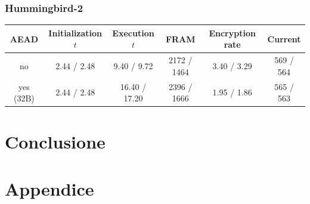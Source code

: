 \documentclass[target=bach,aauheader=,style=]{thud}
\begin{document}
		\subsection{Hummingbird-2}
		\begin{center}
			\begin{tabular}{|c| *{5}{c|}}
				\hline
				\textbf{AEAD} & \textbf{Initialization} $t$& \textbf{Execution} $t$ & \textbf{FRAM} & \textbf{Encryption rate} & \textbf{Current} \\
				\hline
				no & \textcolor{Mahogany}{2.44} / \textcolor{OliveGreen}{2.48} & \textcolor{Mahogany}{9.40} / \textcolor{OliveGreen}{9.72} & \textcolor{Mahogany}{2172} / \textcolor{OliveGreen}{1464} & \textcolor{Mahogany}{3.40} / \textcolor{OliveGreen}{3.29} & \textcolor{Mahogany}{569} / \textcolor{OliveGreen}{564} \\
				\hline
				yes (32B) & \textcolor{Mahogany}{2.44} / \textcolor{OliveGreen}{2.48} & \textcolor{Mahogany}{16.40} / \textcolor{OliveGreen}{17.20} & \textcolor{Mahogany}{2396} / \textcolor{OliveGreen}{1666} & \textcolor{Mahogany}{1.95} / \textcolor{OliveGreen}{1.86} & \textcolor{Mahogany}{565} / \textcolor{OliveGreen}{563} \\
				\hline
			\end{tabular}
		\end{center}
		
		
\chapter{Conclusione}



\appendix


\chapter{Appendice}


\backmatter





\end{document}

